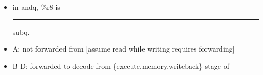 \begin{frame}
\begin{itemize}
\begin{itemize}
    \item in andq, \%r8 is \rule{3cm}{2pt} subq.
\end{itemize}
\vspace{-.15cm}
    \begin{itemize}
    \item A: not forwarded from [assume read while writing requires forwarding]
    \item B-D: forwarded to decode from \{execute,memory,writeback\} stage of
    \end{itemize}
\end{itemize}
\end{frame}

